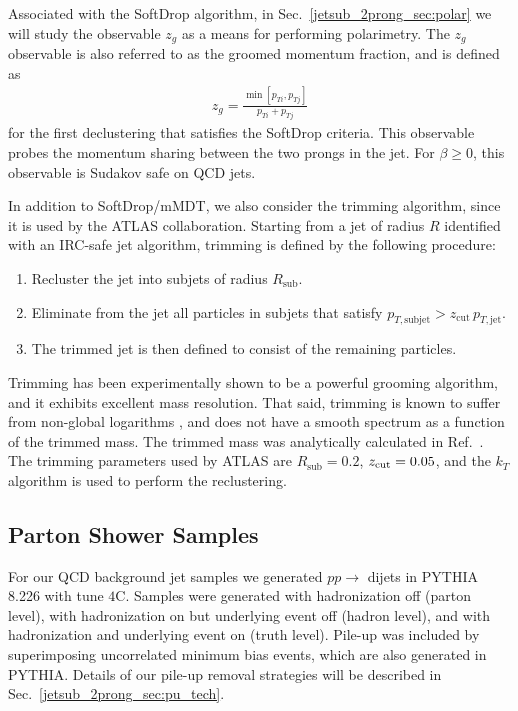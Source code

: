 \documentclass[11pt,letterpaper]{article}
\begin{document}
Associated with the SoftDrop algorithm, in Sec.~\ref{jetsub_2prong_sec:polar} we will study the observable $z_g$ as a means for performing polarimetry.
%
The $z_g$ observable is also referred to as the groomed momentum fraction, and is defined as
%
\begin{align}
z_g=\frac{\min\left[ p_{Ti}, p_{Tj}  \right]}{p_{Ti}+p_{Tj}}
\end{align}
%
for the first declustering that satisfies the SoftDrop criteria.
%
This observable probes the momentum sharing between the two prongs in the
jet. For $\beta \ge 0$, this observable is Sudakov safe \cite{Larkoski:2013paa,Larkoski:2015lea} on QCD
jets.

In addition to SoftDrop/mMDT, we also consider the trimming algorithm, since it is used by the ATLAS collaboration.
%
Starting from a jet of radius $R$ identified with an IRC-safe jet algorithm, trimming is defined by the following procedure:
%
\begin{enumerate}
%
\item Recluster the jet into subjets of radius $R_{\text{sub}}$.
%
\item Eliminate from the jet all particles in subjets that satisfy
  $p_{T,\text{subjet}} > z_{\text{cut}} \, p_{T,\text{jet}}$.
%
\item The trimmed jet is then defined to consist of the remaining particles.
%
\end{enumerate}
%
Trimming has been experimentally shown to be a powerful grooming algorithm, and it exhibits excellent mass resolution.
%
That said, trimming is known to suffer from non-global logarithms \cite{Dasgupta:2001sh}, and does not have a smooth spectrum as a function of the trimmed mass.
%
The trimmed mass was analytically calculated in Ref.~\cite{Dasgupta:2013ihk}.
%
The trimming parameters used by ATLAS are $R_{\text{sub}}=0.2$,  $ {z_{\rm cut}}=0.05$, and the $k_T$ algorithm is used to perform the reclustering.


\subsection{Parton Shower Samples}\label{jetsub_2prong_sec:samples_sub}



For our QCD background jet samples we generated $pp\to$ dijets in \textsc{PYTHIA} 8.226 \cite{Sjostrand:2006za,Sjostrand:2007gs} with tune $4$C. 
%
Samples were generated with hadronization off (parton level), with hadronization on but underlying event off (hadron level), and with hadronization and underlying event on (truth level). Pile-up was included by superimposing uncorrelated minimum bias events, which are also generated in \textsc{PYTHIA}. Details of our pile-up removal strategies will be described in Sec.~\ref{jetsub_2prong_sec:pu_tech}.
\end{document}
